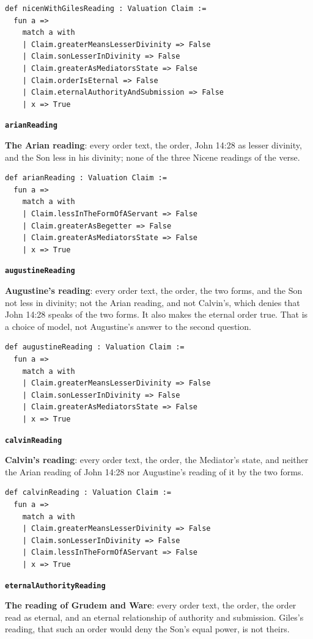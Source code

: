 \documentclass[11pt,paper=\testimonypaper,DIV=13,parskip=false]{scrartcl}
\begin{document}
{\small\begin{verbatim}
def nicenWithGilesReading : Valuation Claim :=
  fun a =>
    match a with
    | Claim.greaterMeansLesserDivinity => False
    | Claim.sonLesserInDivinity => False
    | Claim.greaterAsMediatorsState => False
    | Claim.orderIsEternal => False
    | Claim.eternalAuthorityAndSubmission => False
    | x => True
\end{verbatim}}
\par\medskip\noindent\textbf{\texttt{arian\allowbreak{}Reading}}\par\nobreak\noindent
\textbf{The Arian reading}: every order text, the order, John 14:28 as lesser divinity, and the Son less in his divinity; none of the three Nicene readings of the verse.

{\small\begin{verbatim}
def arianReading : Valuation Claim :=
  fun a =>
    match a with
    | Claim.lessInTheFormOfAServant => False
    | Claim.greaterAsBegetter => False
    | Claim.greaterAsMediatorsState => False
    | x => True
\end{verbatim}}
\par\medskip\noindent\textbf{\texttt{augustine\allowbreak{}Reading}}\par\nobreak\noindent
\textbf{Augustine’s reading}: every order text, the order, the two forms, and the Son not less in divinity; not the Arian reading, and not Calvin’s, which denies that John 14:28 speaks of the two forms. It also makes the eternal order true. That is a choice of model, not Augustine’s answer to the second question.

{\small\begin{verbatim}
def augustineReading : Valuation Claim :=
  fun a =>
    match a with
    | Claim.greaterMeansLesserDivinity => False
    | Claim.sonLesserInDivinity => False
    | Claim.greaterAsMediatorsState => False
    | x => True
\end{verbatim}}
\par\medskip\noindent\textbf{\texttt{calvin\allowbreak{}Reading}}\par\nobreak\noindent
\textbf{Calvin’s reading}: every order text, the order, the Mediator’s state, and neither the Arian reading of John 14:28 nor Augustine’s reading of it by the two forms.

{\small\begin{verbatim}
def calvinReading : Valuation Claim :=
  fun a =>
    match a with
    | Claim.greaterMeansLesserDivinity => False
    | Claim.sonLesserInDivinity => False
    | Claim.lessInTheFormOfAServant => False
    | x => True
\end{verbatim}}
\par\medskip\noindent\textbf{\texttt{eternal\allowbreak{}Authority\allowbreak{}Reading}}\par\nobreak\noindent
\textbf{The reading of Grudem and Ware}: every order text, the order, the order read as eternal, and an eternal relationship of authority and submission. Giles’s reading, that such an order would deny the Son’s equal power, is not theirs.
\end{document}
